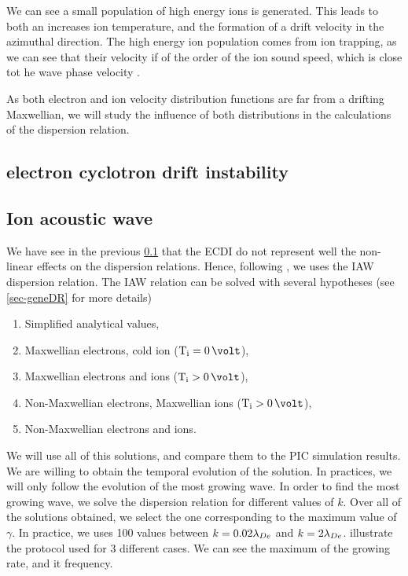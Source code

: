   We can see a small population of high energy ions is generated.
  This leads to both an increases ion temperature, and the formation of a drift velocity in the azimuthal direction.
  The high energy ion population comes from ion trapping, as we can see that their velocity if of the order of the ion sound speed, which is close tot he wave phase velocity \citet{lafleur2018}.
  
  \vspace{1em}
  As both electron and ion velocity distribution functions are far from a drifting Maxwellian, we will study the influence of both distributions in the calculations of the dispersion relation.
  
  
  
  \subsection{electron cyclotron drift instability} \label{subsec-ECDIPIC}
  
  
  
  
  
  \subsection{Ion acoustic wave} \label{subsec-VDFIAW}
  
  We have see in the previous \cref{subsec-ECDIPIC} that the \ac{ECDI} do not represent well the non-linear effects on the dispersion relations.
  Hence, following \citet{janhunen2018,taccogna2019}, we uses the \ac{IAW} dispersion relation.
  The \ac{IAW} relation can be solved with several hypotheses (see \cref{sec-geneDR} for more details)
  \begin{enumerate}
    \item Simplified analytical values,
    \item Maxwellian electrons, cold ion ($\Ti = 0\,\volt$),
    \item Maxwellian electrons and ions ($\Ti > 0\,\volt$),
    \item Non-Maxwellian electrons, Maxwellian ions ($\Ti > 0\,\volt$),
    \item Non-Maxwellian electrons and ions.
  \end{enumerate}
  
  We will use all of this solutions, and compare them to the \ac{PIC} simulation results.
  We are willing to obtain the temporal evolution of the solution.
  In practices, we will only follow the evolution of the most growing wave.
  In order to find the most growing wave, we solve the dispersion relation for different values of $k$.
  Over all of the solutions obtained, we select the one corresponding to the maximum value of $\gamma$.
  In practice, we uses 100 values between $k=0.02 \lambda_{De}$ and $k = 2 \lambda_{De}$.
   illustrate the protocol used for 3 different cases.
  We can see the maximum of the growing rate, and it frequency.
  
